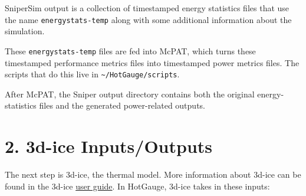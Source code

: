 \documentclass[11pt]{article}
\begin{document}
SniperSim output is a collection of timestamped energy statistics files that use the name \texttt{energystats-temp} along with some additional information about the simulation.

These \texttt{energystats-temp} files are fed into McPAT, which turns these timestamped
performance metrics files into timestamped power metrics files. The scripts that do this live in
\texttt{\textasciitilde/HotGauge/scripts}.

After McPAT, the Sniper output directory contains both the original energy-statistics files and the generated power-related outputs.

\section*{2. 3d-ice Inputs/Outputs}

The next step is 3d-ice, the thermal model. More information about 3d-ice can be found in the 3d-ice \href{https://eslweb.epfl.ch/3Dice/3D-ICE-User_Guide.pdf}{user guide}. In HotGauge, 3d-ice takes in these inputs:
\end{document}
